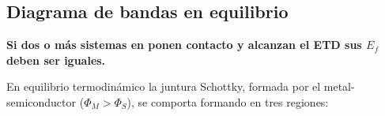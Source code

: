 \documentclass[a4paper]{article}
\begin{document}
			
			
			
			
			
			
			
			
			
			
			
		
	






\subsection{Diagrama de bandas en equilibrio}


\textbf{Si dos o más sistemas en ponen contacto y alcanzan el ETD  sus $E_f$ deben ser iguales.}

En equilibrio termodinámico la juntura Schottky, formada por el metal-semiconductor ($\Phi_M > \Phi_S$), se comporta formando en tres regiones:
\end{document}
